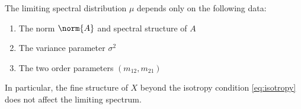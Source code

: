 \begin{corollary}\label{cor:universality}
The limiting spectral distribution $\mu$ depends only on the following data:
\begin{enumerate}
\item The norm $\norm{A}$ and spectral structure of $A$
\item The variance parameter $\sigma^2$
\item The two order parameters $(m_{12}, m_{21})$
\end{enumerate}
In particular, the fine structure of $X$ beyond the isotropy condition \eqref{eq:isotropy} does not affect the limiting spectrum.
\end{corollary}
